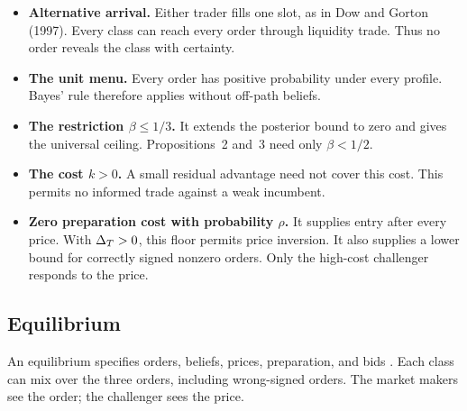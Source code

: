 \begin{intuition}
\begin{itemize}
\item \textbf{Alternative arrival.} Either trader fills one slot, as in Dow and Gorton (1997).
Every class can reach every order through liquidity trade.
Thus no order reveals the class with certainty.
\item \textbf{The unit menu.} Every order has positive probability under every profile.
Bayes' rule therefore applies without off-path beliefs.
\item \textbf{The restriction \(\beta\le1/3\).}
It extends the posterior bound to zero and gives the universal ceiling.
Propositions~2 and~3 need only \(\beta<1/2\).
\item \textbf{The cost \(k>0\).}
A small residual advantage need not cover this cost.
This permits no informed trade against a weak incumbent.
\item \textbf{Zero preparation cost with probability \(\rho\).}
It supplies entry after every price.
With \(\Delta_T>0\), this floor permits price inversion.
It also supplies a lower bound for correctly signed nonzero orders.
Only the high-cost challenger responds to the price.
\end{itemize}
\end{intuition}

\subsection{Equilibrium}\label{sec:02_model-equilibrium}

An equilibrium specifies orders, beliefs, prices, preparation, and bids .
Each class can mix over the three orders, including wrong-signed orders.
The market makers see the order; the challenger sees the price.

